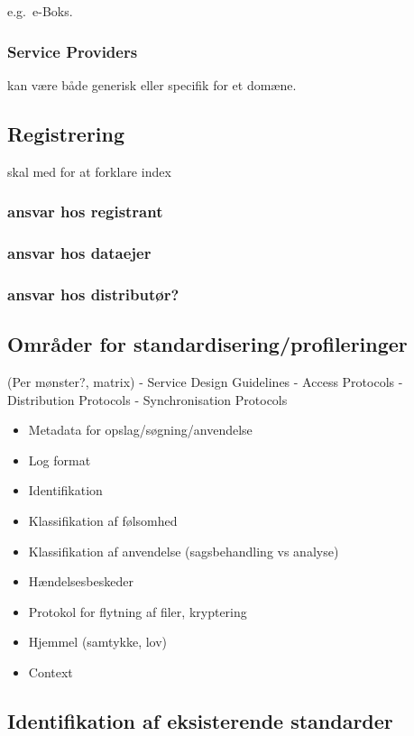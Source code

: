 e.g.~e-Boks.

\subsubsection{Service Providers}\label{service-providers}

kan være både generisk eller specifik for et domæne.

\subsection{Registrering}\label{registrering}

skal med for at forklare index

\subsubsection{ansvar hos registrant}\label{ansvar-hos-registrant}

\subsubsection{ansvar hos dataejer}\label{ansvar-hos-dataejer}

\subsubsection{ansvar hos distributør?}\label{ansvar-hos-distributuxf8r}

\subsection{Områder for
standardisering/profileringer}\label{omruxe5der-for-standardiseringprofileringer}

(Per mønster?, matrix) - Service Design Guidelines - Access Protocols -
Distribution Protocols - Synchronisation Protocols

\begin{itemize}
\tightlist
\item
  Metadata for opslag/søgning/anvendelse
\item
  Log format
\item
  Identifikation
\item
  Klassifikation af følsomhed
\item
  Klassifikation af anvendelse (sagsbehandling vs analyse)
\item
  Hændelsesbeskeder
\item
  Protokol for flytning af filer, kryptering
\item
  Hjemmel (samtykke, lov)
\item
  Context
\end{itemize}

\subsection{Identifikation af eksisterende
standarder}\label{identifikation-af-eksisterende-standarder}
